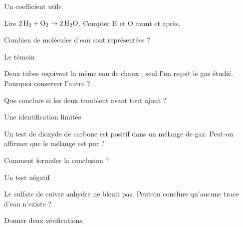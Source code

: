 \par\noindent\begin{minipage}{\linewidth}
\begin{exercice}[2]{Un coefficient utile}
\begin{questions}
\item Lire $2\,\ce{H2}+\ce{O2}\rightarrow2\,\ce{H2O}$. Compter H et O avant et après.
\item Combien de molécules d’eau sont représentées ?
\end{questions}
\end{exercice}
\end{minipage}
\par\noindent\begin{minipage}{\linewidth}
\begin{exercice}[2]{Le témoin}
\begin{questions}
\item Deux tubes reçoivent la même eau de chaux ; seul l’un reçoit le gaz étudié. Pourquoi conserver l’autre ?
\item Que conclure si les deux troublent avant tout ajout ?
\end{questions}
\end{exercice}
\end{minipage}
\par\noindent\begin{minipage}{\linewidth}
\begin{exercice}[2]{Une identification limitée}
\begin{questions}
\item Un test de dioxyde de carbone est positif dans un mélange de gaz. Peut-on affirmer que le mélange est pur ?
\item Comment formuler la conclusion ?
\end{questions}
\end{exercice}
\end{minipage}
\par\noindent\begin{minipage}{\linewidth}
\begin{exercice}[2]{Un test négatif}
\begin{questions}
\item Le sulfate de cuivre anhydre ne bleuit pas. Peut-on conclure qu’aucune trace d’eau n’existe ?
\item Donner deux vérifications.
\end{questions}
\end{exercice}
\end{minipage}
